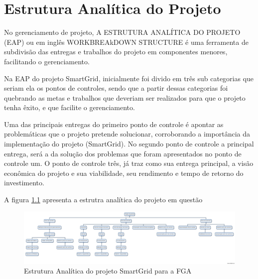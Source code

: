 \chapter[Estrutura Analítica do Projeto]{Estrutura Analítica do Projeto}

No gerenciamento de projeto, A ESTRUTURA ANALÍTICA DO PROJETO (EAP) ou em inglês WORKBREAkDOWN STRUCTURE é uma ferramenta de subdivisão das entregas e trabalhos do projeto em componentes menores, facilitando o gerenciamento.

Na EAP do projeto SmartGrid, inicialmente foi divido em três sub categorias que seriam ela os pontos de controles, sendo que a partir dessas categorias foi quebrando as metas e trabalhos que deveriam ser realizados para que o projeto tenha êxito, e que facilite o gerenciamento. 

Uma das principais entregas do primeiro ponto de controle é apontar as problemáticas que o projeto pretende solucionar, corroborando a importância da implementação do projeto (SmartGrid). No segundo ponto de controle a principal entrega, será a da solução dos problemas que foram apresentados no ponto de controle um. O ponto de controle três, já traz como sua entrega principal, a visão econômica do projeto e sua viabilidade, seu rendimento e tempo de retorno do investimento.

A figura \ref{fig:eap} apresenta a estrutra analítica do projeto em questão

\begin{figure}[!h]
	\centering
	\includegraphics[angle=270, scale=.3]{figuras/EAP.jpg}
	\caption{Estrutura Analítica do projeto SmartGrid para a FGA}
	\label{fig:eap}
\end{figure}